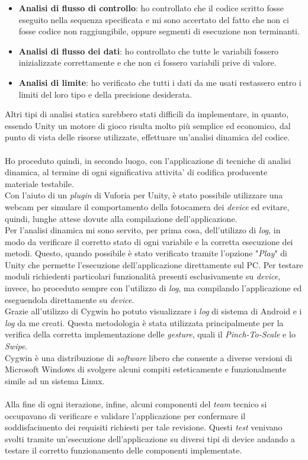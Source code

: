 \begin{itemize}
	\item \textbf{Analisi di flusso di controllo}: ho controllato che il codice scritto fosse eseguito nella sequenza specificata e mi sono accertato del fatto che non ci fosse codice non raggiungibile, oppure segmenti di esecuzione non terminanti.
	\item \textbf{Analisi di flusso dei dati}: ho controllato che tutte le variabili fossero inizializzate correttamente e che non ci fossero variabili prive di valore.
	\item \textbf{Analisi di limite}: ho verificato che tutti i dati da me usati restassero entro i limiti del loro tipo e della precisione desiderata.
\end{itemize}

Altri tipi di analisi statica sarebbero stati difficili da implementare, in quanto, essendo Unity un motore di gioco risulta molto pi\`u semplice ed economico, dal punto di vista delle risorse utilizzate, effettuare un'analisi dinamica del codice.\\\\

Ho proceduto quindi, in secondo luogo, con l'applicazione di tecniche di analisi dinamica, al termine di ogni significativa attivita' di codifica producente materiale testabile.\\
Con l'aiuto di un \textit{plugin} di Vuforia per Unity, \`e stato possibile utilizzare una webcam per simulare il comportamento della fotocamera dei \textit{device} ed evitare, quindi, lunghe attese dovute alla compilazione dell'applicazione.\\
Per l'analisi dinamica mi sono servito, per prima cosa, dell'utilizzo di \textit{log}, in modo da verificare il corretto stato di ogni variabile e la corretta esecuzione dei metodi. Questo, quando possibile \`e stato verificato tramite l'opzione "\textit{Play}" di Unity che permette l'esecuzione dell'applicazione direttamente sul PC. Per testare moduli richiedenti particolari funzionalit\`a presenti esclusivamente su \textit{device}, invece, ho proceduto sempre con l'utilizzo di \textit{log}, ma compilando l'applicazione ed eseguendola direttamente su \textit{device}.\\
Grazie all'utilizzo di Cygwin ho potuto visualizzare i \textit{log} di sistema di Android e i \textit{log} da me creati. Questa metodologia \`e stata utilizzata principalmente per la verifica della corretta implementazione delle \textit{gesture}, quali il \textit{Pinch-To-Scale} e lo \textit{Swipe}.\\
Cygwin \`e una distribuzione di \textit{software\gloss} libero che consente a diverse versioni di Microsoft Windows di svolgere alcuni compiti esteticamente e funzionalmente simile ad un sistema Linux.\\\\
Alla fine di ogni iterazione, infine, alcuni componenti del \textit{team} tecnico si occupavano di verificare e validare l'applicazione per confermare il soddisfacimento dei requisiti richiesti per tale revisione. Questi \textit{test} venivano svolti tramite un'esecuzione dell'applicazione su diversi tipi di device andando a testare il corretto funzionamento delle componenti implementate.

